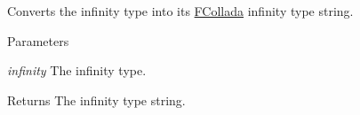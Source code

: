 \label{namespaceFUDaeInfinity_abbb3cb1b428c493aeb71798dbcb6a24f}
Converts the infinity type into its \hyperlink{namespaceFCollada}{FCollada} infinity type string. 
\begin{DoxyParams}{Parameters}
\item[{\em infinity}]The infinity type. \end{DoxyParams}
\begin{DoxyReturn}{Returns}
The infinity type string. 
\end{DoxyReturn}
